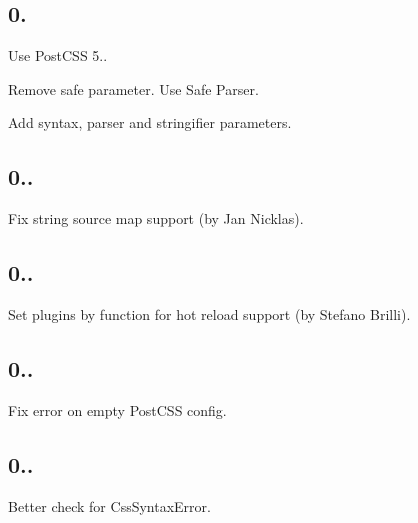\subsection*{0.}


\begin{DoxyItemize}
\item Use Post\+C\+SS 5..
\item Remove {\ttfamily safe} parameter. Use Safe Parser.
\item Add {\ttfamily syntax}, {\ttfamily parser} and {\ttfamily stringifier} parameters.
\end{DoxyItemize}

\subsection*{0..}


\begin{DoxyItemize}
\item Fix string source map support (by Jan Nicklas).
\end{DoxyItemize}

\subsection*{0..}


\begin{DoxyItemize}
\item Set plugins by function for hot reload support (by Stefano Brilli).
\end{DoxyItemize}

\subsection*{0..}


\begin{DoxyItemize}
\item Fix error on empty Post\+C\+SS config.
\end{DoxyItemize}

\subsection*{0..}


\begin{DoxyItemize}
\item Better check for {\ttfamily Css\+Syntax\+Error}.
\end{DoxyItemize}


